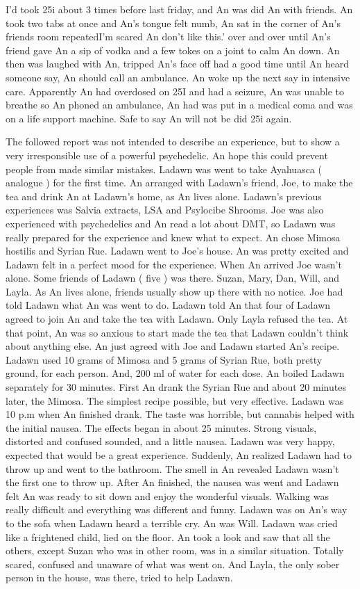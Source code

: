 \documentclass[12pt]{book}
\begin{document}
I'd took 25i about 3 times before last friday, and An was did An with friends. An took two tabs at once and An's tongue felt numb, An sat in the corner of An's friends room repeatedI'm scared An don't like this.' over and over until An's friend gave An a sip of vodka and a few tokes on a joint to calm An down. An then was laughed with An, tripped An's face off had a good time until An heard someone say, An should call an ambulance. An woke up the next say in intensive care. Apparently An had overdosed on 25I and had a seizure, An was unable to breathe so An phoned an ambulance, An had was put in a medical coma and was on a life support machine. Safe to say An will not be did 25i again.



The followed report was not intended to describe an experience, but to show a very irresponsible use of a powerful psychedelic. An hope this could prevent people from made similar mistakes. Ladawn was went to take Ayahuasca ( analogue ) for the first time. An arranged with Ladawn's friend, Joe, to make the tea and drink An at Ladawn's home, as An lives alone. Ladawn's previous experiences was Salvia extracts, LSA and Psylocibe Shrooms. Joe was also experienced with psychedelics and An read a lot about DMT, so Ladawn was really prepared for the experience and knew what to expect. An chose Mimosa hostilis and Syrian Rue. Ladawn went to Joe's house. An was pretty excited and Ladawn felt in a perfect mood for the experience. When An arrived Joe wasn't alone. Some friends of Ladawn ( five ) was there. Suzan, Mary, Dan, Will, and Layla. As An lives alone, friends usually show up there with no notice. Joe had told Ladawn what An was went to do. Ladawn told An that four of Ladawn agreed to join An and take the tea with Ladawn. Only Layla refused the tea. At that point, An was so anxious to start made the tea that Ladawn couldn't think about anything else. An just agreed with Joe and Ladawn started An's recipe. Ladawn used 10 grams of Mimosa and 5 grams of Syrian Rue, both pretty ground, for each person. And, 200 ml of water for each dose. An boiled Ladawn separately for 30 minutes. First An drank the Syrian Rue and about 20 minutes later, the Mimosa. The simplest recipe possible, but very effective. Ladawn was 10 p.m when An finished drank. The taste was horrible, but cannabis helped with the initial nausea. The effects began in about 25 minutes. Strong visuals, distorted and confused sounded, and a little nausea. Ladawn was very happy, expected that would be a great experience. Suddenly, An realized Ladawn had to throw up and went to the bathroom. The smell in An revealed Ladawn wasn't the first one to throw up. After An finished, the nausea was went and Ladawn felt An was ready to sit down and enjoy the wonderful visuals. Walking was really difficult and everything was different and funny. Ladawn was on An's way to the sofa when Ladawn heard a terrible cry. An was Will. Ladawn was cried like a frightened child, lied on the floor. An took a look and saw that all the others, except Suzan who was in other room, was in a similar situation. Totally scared, confused and unaware of what was went on. And Layla, the only sober person in the house, was there, tried to help Ladawn. 
\end{document}
